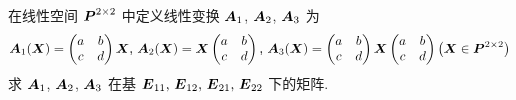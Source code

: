 \begin{example}
    在线性空间 $\vb*{P}^{2\times2}$ 中定义线性变换 $\vb*{A}_1$, $\vb*{A}_2$, $\vb*{A}_3$ 为
    $$\vb*{A}_1(\vb*{X})=\begin{pmatrix}
            a & b \\
            c & d
        \end{pmatrix}\vb*{X}\text{, }\vb*{A}_2(\vb*{X})=\vb*{X}\begin{pmatrix}
            a & b \\
            c & d
        \end{pmatrix}\text{, }\vb*{A}_3(\vb*{X})=\begin{pmatrix}
            a & b \\
            c & d
        \end{pmatrix}\vb*{X}\begin{pmatrix}
            a & b \\
            c & d
        \end{pmatrix}\qty(\vb*{X}\in \vb*{P}^{2\times2})$$
    求 $\vb*{A}_1$, $\vb*{A}_2$, $\vb*{A}_3$ 在基 $\vb*{E}_{11}\text{, }\vb*{E}_{12}\text{, }\vb*{E}_{21}\text{, }\vb*{E}_{22}$ 下的矩阵.
\end{example}
